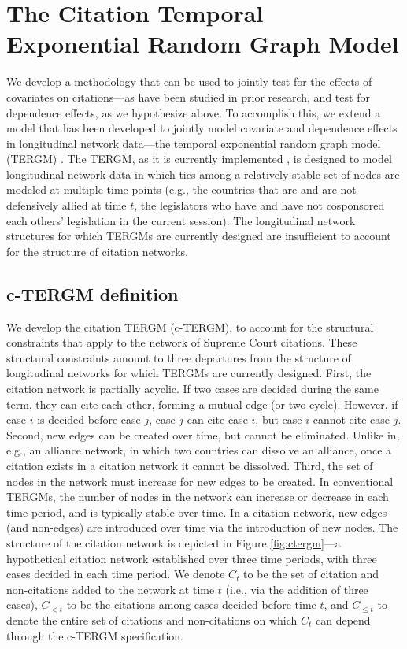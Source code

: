 \documentclass[headsepline=true, abstracton]{scrartcl}
\begin{document}
 
 \section{The Citation Temporal Exponential Random Graph Model}
We develop a methodology that can be used to jointly test for the effects of covariates on citations---as have been studied in prior research, and test for dependence effects, as we hypothesize above. To accomplish this, we extend a model that has been developed to jointly model covariate and dependence effects in longitudinal network data---the temporal exponential random graph model (TERGM) \citep[e.g.,][]{cranmer2012complex,clark2013multimember, masket2015polarization, graif2017neighborhood}. The TERGM, as it is currently implemented \citep{leifeld2017temporal,  tergm}, is designed to model longitudinal network data in which ties among a relatively stable set of nodes are modeled at multiple time points (e.g., the countries that are and are not defensively allied at time $t$, the legislators who have and have not cosponsored each others' legislation in the current session).  The longitudinal network structures for which TERGMs are currently designed are insufficient to account for the structure of citation networks.


\subsection{c-TERGM definition}

We develop the citation TERGM (c-TERGM), to account for the structural constraints that apply to the network of Supreme Court citations. These structural constraints amount to three departures from the structure of longitudinal networks for which TERGMs are currently designed. First, the citation network is partially acyclic. If two cases are decided during the same term, they can cite each other, forming a mutual edge (or two-cycle). However, if case $i$ is decided before case $j$, case $j$ can cite case $i$, but case $i$ cannot cite case $j$. Second, new edges can be created over time, but cannot be eliminated. Unlike in, e.g., an alliance network, in which two countries can dissolve an alliance, once a citation exists in a citation network it cannot be dissolved. Third, the set of nodes in the network must increase for new edges to be created. In conventional TERGMs, the number of nodes in the network can increase or decrease in each time period, and is typically stable over time. In a citation network, new edges (and non-edges) are introduced over time via the introduction of new nodes. The structure of the citation network is depicted in Figure \ref{fig:ctergm}---a hypothetical citation network established over three time periods, with three cases decided in each time period. We denote $C_t$ to be the set of citation and non-citations added to the network at time $t$ (i.e., via the addition of three cases), $C_{ <t}$ to be the citations among cases decided before time $t$, and $C_{ \leq t}$ to denote the entire set of citations and non-citations on which $C_t$ can depend through the c-TERGM specification.
\end{document}

